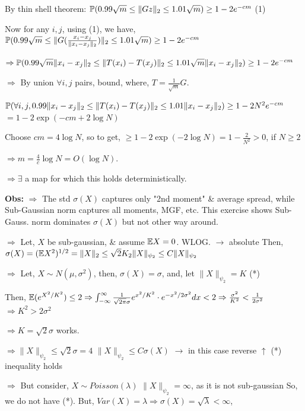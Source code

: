 \documentclass[12pt]{article}
\begin{document}
By thin shell theorem:
$\mathbb{P}(0.99 \sqrt{m} \leq \|Gz\|_2 \leq 1.01 \sqrt{m}) \geq 1 - 2e^{-cm}$ \hspace{2cm} (1)

Now for any $i,j$, using (1), we have, $\mathbb{P}(0.99 \sqrt{m} \leq \|G(\frac{x_i-x_j}{\|x_i-x_j\|_2})\|_2 \leq 1.01 \sqrt{m}) \geq 1 - 2e^{-cm}$

$\Rightarrow \mathbb{P}(0.99 \sqrt{m} \|x_i-x_j\|_2 \leq \|T(x_i)-T(x_j)\|_2 \leq 1.01 \sqrt{m} \|x_i-x_j\|_2) \geq 1 - 2e^{-cm}$

$\Rightarrow$ By union $\forall i,j$ pairs,
bound, \hspace{4cm} where, $T = \frac{1}{\sqrt{m}} G$.

$\mathbb{P}(\forall i,j, 0.99 \|x_i-x_j\|_2 \leq \|T(x_i)-T(x_j)\|_2 \leq 1.01 \|x_i-x_j\|_2) \geq 1 - 2N^2e^{-cm}$
\hspace{7cm} $= 1 - 2\exp(-cm+2\log N)$

Choose $cm = 4\log N$, so to get, $\geq 1 - 2\exp(-2\log N) = 1 - \frac{2}{N^2} > 0$, if $N \geq 2$

$\Rightarrow m = \frac{4}{c}\log N = O(\log N)$.

$\Rightarrow \exists$ a map for which this holds deterministically.

\textbf{Obs:}
$\Rightarrow$ The std $\sigma(X)$ captures only "2nd moment" \& average spread, while Sub-Gaussian
norm captures all moments, MGF, etc. This exercise shows Sub-Gauss.
norm dominates $\sigma(X)$ but not other way around.

$\Rightarrow$ Let, $X$ be sub-gaussian, \& assume $\mathbb{E} X = 0$. WLOG.
\hspace{7cm} $\to$ absolute
Then, $\sigma(X) = (\mathbb{E} X^2)^{1/2} = \|X\|_2 \leq \sqrt{2} K_2 \|X\|_{\psi_2} \leq C \|X\|_{\psi_2}$

$\Rightarrow$ Let, $X \sim N(\mu, \sigma^2)$, then, $\sigma(X) = \sigma$, and, let $\|X\|_{\psi_2} = K$ \hspace{1cm} (*)

Then, $\mathbb{E}(e^{X^2/K^2}) \leq 2 \Rightarrow \int_{-\infty}^{\infty} \frac{1}{\sqrt{2\pi}\sigma} e^{x^2/K^2} \cdot e^{-x^2/2\sigma^2} dx < 2 \Rightarrow \frac{\sigma^2}{K^2} < \frac{1}{2\sigma^2}$
\hspace{8cm} $\Rightarrow K^2 > 2\sigma^2$

$\Rightarrow K = \sqrt{2}\sigma$ works.

$\Rightarrow \|X\|_{\psi_2} \leq \sqrt{2}\sigma = 4$ \hspace{1cm} $\boxed{\|X\|_{\psi_2} \leq C \sigma(X)}$ $\to$ in this case reverse
\hspace{5cm} $\uparrow$ (*) \hspace{2cm} inequality holds

$\Rightarrow$ But consider, $X \sim Poisson(\lambda)$
$\|X\|_{\psi_2} = \infty$, as it is not sub-gaussian
\hspace{3cm} So, we do not have (*).
But, $Var(X) = \lambda \Rightarrow \sigma(X) = \sqrt{\lambda} < \infty$,
\end{document}

